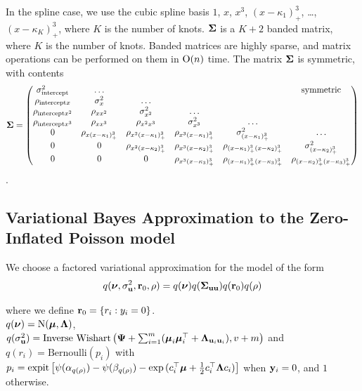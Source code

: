 In the spline case, we use the cubic spline basis $1$, $x$, $x^3$, $(x - \kappa_1)^3_+$, \ldots, $(x -
\kappa_K)^3_+$, where $K$ is the number of knots. ${\boldsymbol \Sigma}$ is a $K + 2$ banded matrix, where $K$ is the
number of knots. Banded matrices are highly sparse, and matrix operations can be performed on them in
$\text{O}(n)$ time. The matrix ${\boldsymbol \Sigma}$ is symmetric, with contents
\[
	{\boldsymbol \Sigma} =
	\begin{pmatrix}
		\sigma^2_{\text{intercept}} & \ldots                      &                             &                               &                                          & \text{symmetric}              \\
		\rho_{\text{intercept} x} & \sigma^2_x & \ldots\\
		\rho_{\text{intercept} x^2} & \rho_{x x^2} & \sigma^2_{x^2} & \ldots \\
		\rho_{\text{intercept} x^3} & \rho_{x x^3} & \rho_{x^2 x^3} & \sigma^2_{x^3} & \ldots \\
		0                           & \rho_{x (x - \kappa_1)^3_+} & \rho_{x^2 (x-\kappa_1)_+^3} & \rho_{x^3 (x - \kappa_1)_+^3} & \sigma^2_{(x - \kappa_1)_+^3}            & \ldots                        \\
		0                           & 0                           & \rho_{x^2 (x-\kappa_2)_+^3} & \rho_{x^3 (x-\kappa_2)_+^3}   & \rho_{(x-\kappa_1)_+^3 (x-\kappa_2)_+^3} & \sigma^2_{(x - \kappa_2)_+^3} \\
		0 & 0 & 0 & \rho_{x^3 (x - \kappa_3)_+^3} & \rho_{(x - \kappa_1)_+^3 (x - \kappa_3)_+^3} & \rho_{(x - \kappa_2)_+^3 (x - \kappa_3)_+^3} \\
	\end{pmatrix}
\].

\subsection{Variational Bayes Approximation to the Zero-Inflated Poisson model}

We choose a factored variational approximation for the model of the form 
\[
	q({\boldsymbol \nu}, \sigma_{{\bf u}}^2,{\bf r}_0, \rho) = q({\boldsymbol \nu}) q({\boldsymbol \Sigma}_{{\bf u} {\bf u}}) q({\bf r}_0) q(\rho)
\]

\noindent 
where we define ${\bf r}_0 = \{ r_i : y_i = 0 \}$. \\
$q({\boldsymbol \nu}) = \text{N}({\boldsymbol \mu}, {\boldsymbol \Lambda})$, \\
$q(\sigma_{{\bf u}}^2) = \text{Inverse Wishart}\left({\boldsymbol \Psi} + \sum_{i=1}^m ({\boldsymbol \mu}_i {\boldsymbol \mu}_i^\top + {\boldsymbol \Lambda}_{{\bf u}_i {\bf u}_i}), v + m \right)$ \mbox{and } \\
$q(r_i) = \text{Bernoulli}{(p_i)}$ with
$p_i = \text{expit}\left[ \psi{(\alpha_{q(\rho)})} - \psi{(\beta_{q(\rho)})} - \exp{(c_i^\top{\boldsymbol\mu}+ \frac{1}{2} c_i^\top {\boldsymbol\Lambda}c_i)} \right]$ when ${\bf y}_i = 0$, and $1$ otherwise.

